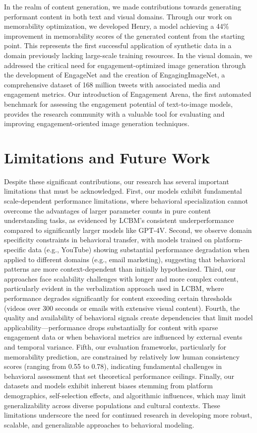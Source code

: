In the realm of content generation, we made contributions towards generating performant content in both text and visual domains. Through our work on memorability optimization, we developed Henry, a model achieving a 44\% improvement in memorability scores of the generated content from the starting point. This represents the first successful application of synthetic data in a domain previously lacking large-scale training resources. In the visual domain, we addressed the critical need for engagement-optimized image generation through the development of EngageNet and the creation of EngagingImageNet, a comprehensive dataset of 168 million tweets with associated media and engagement metrics. Our introduction of Engagement Arena, the first automated benchmark for assessing the engagement potential of text-to-image models, provides the research community with a valuable tool for evaluating and improving engagement-oriented image generation techniques.


\section{Limitations and Future Work}
\label{section:conclusion-limitations and future work}

Despite these significant contributions, our research has several important limitations that must be acknowledged. First, our models exhibit fundamental scale-dependent performance limitations, where behavioral specialization cannot overcome the advantages of larger parameter counts in pure content understanding tasks, as evidenced by LCBM's consistent underperformance compared to significantly larger models like GPT-4V. Second, we observe domain specificity constraints in behavioral transfer, with models trained on platform-specific data (e.g., YouTube) showing substantial performance degradation when applied to different domains (e.g., email marketing), suggesting that behavioral patterns are more context-dependent than initially hypothesized. Third, our approaches face scalability challenges with longer and more complex content, particularly evident in the verbalization approach used in LCBM, where performance degrades significantly for content exceeding certain thresholds (videos over 300 seconds or emails with extensive visual content). Fourth, the quality and availability of behavioral signals create dependencies that limit model applicability—performance drops substantially for content with sparse engagement data or when behavioral metrics are influenced by external events and temporal variance. Fifth, our evaluation frameworks, particularly for memorability prediction, are constrained by relatively low human consistency scores (ranging from 0.55 to 0.78), indicating fundamental challenges in behavioral assessment that set theoretical performance ceilings. Finally, our datasets and models exhibit inherent biases stemming from platform demographics, self-selection effects, and algorithmic influences, which may limit generalizability across diverse populations and cultural contexts. These limitations underscore the need for continued research in developing more robust, scalable, and generalizable approaches to behavioral modeling.

